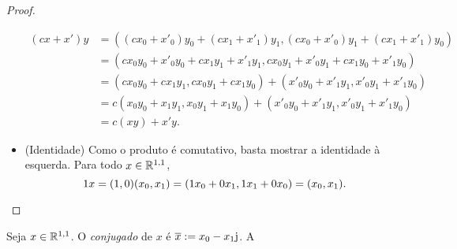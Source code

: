 \begin{proof}
\begin{itemize}
		\begin{align*}
		(cx+x')y &= ((cx_0+x'_0)y_0 + (cx_1+x'_1)y_1, (cx_0+x'_0)y_1 + (cx_1+x'_1)y_0) \\
			&= (cx_0y_0+x'_0y_0 + cx_1y_1+x'_1y_1, cx_0y_1+x'_0y_1 + cx_1y_0+x'_1y_0) \\
			&= (cx_0y_0+cx_1y_1, cx_0y_1+cx_1y_0) + (x'_0y_0+x'_1y_1, x'_0y_1+x'_1y_0) \\
			&= c(x_0y_0+x_1y_1, x_0y_1+x_1y_0) + (x'_0y_0+x'_1y_1, x'_0y_1+x'_1y_0) \\
			&= c(xy) + x'y.
		\end{align*}
	\item (Identidade) Como o produto é comutativo, basta mostrar a identidade à esquerda. Para todo $x \in \mathbb{R}^{1,1}$,
		\begin{equation*}
		1x = (1,0)(x_0,x_1) = (1x_0+0x_1, 1x_1+0x_0) = (x_0, x_1).
		\qedhere
		\end{equation*}
\end{itemize}
\end{proof}

\begin{definition}
Seja $x \in \mathbb{R}^{1,1}$. O \emph{conjugado} de $x$ é $\overline{x} := x_0 - x_1\mathrm{j}$. A 
\end{definition}




